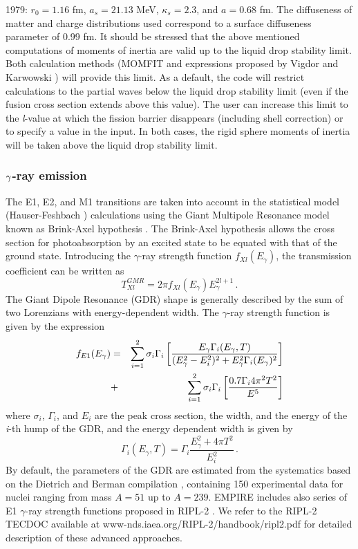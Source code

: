 1979: $r_{0}=1.16$ fm, $a_{s}=21.13$ MeV, $\kappa_{s}=2.3$, and $a=0.68$ fm.
The diffuseness of matter and charge distributions used correspond to a
surface diffuseness parameter of 0.99 fm. It should be stressed that the
above mentioned computations of moments of inertia are valid up to the
liquid drop stability limit. Both calculation methods (MOMFIT and
expressions proposed by Vigdor and Karwowski \cite{VK}) will provide this
limit. As a default, the code will restrict calculations to the partial
waves below the liquid drop stability limit (even if the fusion cross
section extends above this value). The user can increase this limit to the
\emph{l}-value at which the fission barrier disappears (including shell
correction) or to specify a value in the input. In both cases, the rigid
sphere moments of inertia will be taken above the liquid drop stability
limit.

\subsubsection{$\protect\gamma$-ray emission}

The E1, E2, and M1 transitions are taken into account in the statistical
model (Hauser-Feshbach%
) calculations using the Giant Multipole Resonance
model known as Brink-Axel hypothesis \cite{Axel,Brink,Brinka}. The
Brink-Axel hypothesis allows the cross section for photoabsorption by an
excited state to be equated with that of the ground state. Introducing the $%
\gamma$-ray strength function $f_{Xl}(E_{\gamma})$, the transmission
coefficient can be written as
\begin{equation}
T_{Xl}^{GMR}=2\pi f_{Xl}(E_{\gamma})E_{\gamma}^{2l+1}\,.  \label{tgGMR}
\end{equation}
The Giant Dipole Resonance (GDR) shape is generally described by the sum of
two Lorenzians with energy-dependent width. The $\gamma$-ray strength
function is given by the expression \noindent
\begin{eqnarray}
f_{E1}(E_{\gamma})&=&\sum_{i=1}^{2}\sigma_{i}\Gamma_{i}\left[%
\frac{E_{\gamma}\Gamma_{i}(E_{\gamma},T)}{(E_{\gamma}^{2}-E_{i}^{2})^{2}+E_{%
\gamma}^{2}\Gamma_{i}(E_{\gamma})^{2}}\right]  \nonumber \\
&+&\sum_{i=1}^{2}\sigma_{i}\Gamma_{i}\left[\frac{0.7\Gamma_{i}4\pi^{2}T^{2}}{%
E^{5}}\right]  \label{lorenz}
\end{eqnarray}
\noindent where $\sigma_{i}$, $\Gamma_{i}$, and $E_{i}$ are the peak cross
section, the width, and the energy of the \emph{i}-th hump of the GDR, and
the energy dependent width is given by
\begin{equation}
\Gamma_{i}(E_{\gamma},T)=\Gamma_{i}\frac{E_{\gamma}^{2}+4\pi T^{2}}{E_{i}^{2}%
}\,.
\end{equation}
By default, the parameters of the GDR are estimated from the systematics
based on the Dietrich and Berman compilation \cite{die88}, containing 150
experimental data for nuclei ranging from mass $A=51$ up to $A=239$. EMPIRE
includes also series of E1 $\gamma$-ray strength functions proposed in
RIPL-2 \cite{RIPL2}. We refer to the RIPL-2 TECDOC available at
www-nds.iaea.org/RIPL-2/handbook/ripl2.pdf for detailed description of these
advanced approaches.

